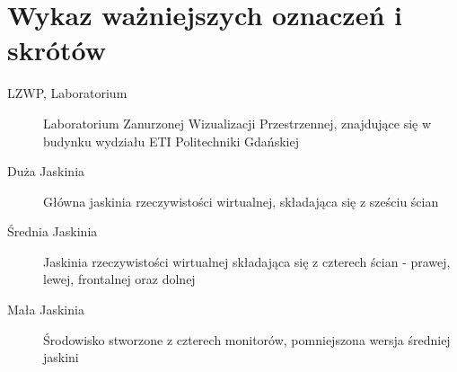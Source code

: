 \chapter*{Wykaz ważniejszych oznaczeń i skrótów}

\begin{description}
	\item [LZWP, Laboratorium] Laboratorium Zanurzonej Wizualizacji Przestrzennej, znajdujące się w budynku wydziału ETI Politechniki Gdańskiej
	\item [Duża Jaskinia] Główna jaskinia rzeczywistości wirtualnej, składająca się z sześciu ścian
	\item [Średnia Jaskinia] Jaskinia rzeczywistości wirtualnej składająca się z czterech ścian - prawej, lewej, frontalnej oraz dolnej
	\item [Mała Jaskinia] Środowisko stworzone z czterech monitorów, pomniejszona wersja średniej jaskini
\end{description}
